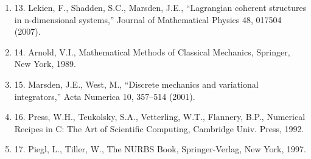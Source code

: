 \documentclass[12pt]{article}
\begin{document}
\begin{enumerate}
\item 13. Lekien, F., Shadden, S.C., Marsden, J.E., ``Lagrangian coherent structures in n-dimensional systems,'' Journal of Mathematical Physics 48, 017504 (2007).
\item 14. Arnold, V.I., Mathematical Methods of Classical Mechanics, Springer, New York, 1989.
\item 15. Marsden, J.E., West, M., ``Discrete mechanics and variational integrators,'' Acta Numerica 10, 357--514 (2001).
\item 16. Press, W.H., Teukolsky, S.A., Vetterling, W.T., Flannery, B.P., Numerical Recipes in C: The Art of Scientific Computing, Cambridge Univ. Press, 1992.
\item 17. Piegl, L., Tiller, W., The NURBS Book, Springer-Verlag, New York, 1997.
\end{enumerate}
\end{document}
